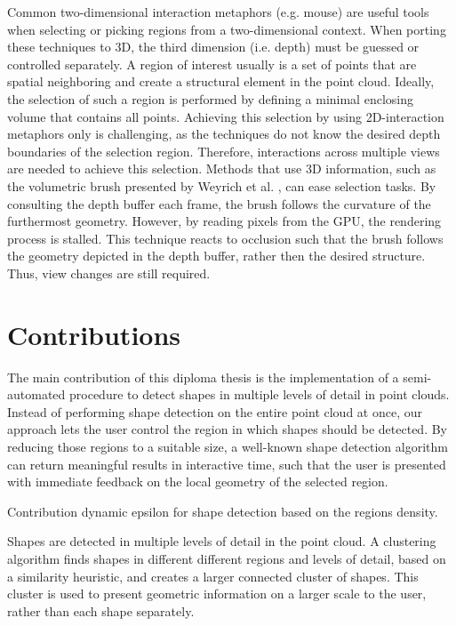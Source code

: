 \par

Common two-dimensional interaction metaphors (e.g. mouse) are useful tools when selecting or picking regions from a two-dimensional context. When porting these techniques to 3D, the third dimension (i.e. depth) must be guessed or controlled separately. A region of interest usually is a set of points that are spatial neighboring and create a structural element in the point cloud. Ideally, the selection of such a region is performed by defining a minimal enclosing volume that contains all points. Achieving this selection by using 2D-interaction metaphors only is challenging, as the techniques do not know the desired depth boundaries of the selection region. Therefore, interactions across multiple views are needed to achieve this selection. Methods that use 3D information, such as the volumetric brush presented by Weyrich et al. \cite{weyrich2004post}, can ease selection tasks. By consulting the depth buffer each frame, the brush follows the curvature of the furthermost geometry. However, by reading pixels from the GPU, the rendering process is stalled. This technique reacts to occlusion such that the brush follows the geometry depicted in the depth buffer, rather then the desired structure. Thus, view changes are still required.


\section{Contributions}

The main contribution of this diploma thesis is the implementation of a semi-automated procedure to detect shapes in multiple levels of detail in point clouds. Instead of performing shape detection on the entire point cloud at once, our approach lets the user control the region in which shapes should be detected. By reducing those regions to a suitable size, a well-known shape detection algorithm can return meaningful results in interactive time, such that the user is presented with immediate feedback on the local geometry of the selected region. 

\par

Contribution dynamic epsilon for shape detection based on the regions density. 

\par

Shapes are detected in multiple levels of detail in the point cloud. A clustering algorithm finds shapes in different different regions and levels of detail, based on a similarity heuristic, and creates a larger connected cluster of shapes. This cluster is used to present geometric information on a larger scale to the user, rather than each shape separately. 

